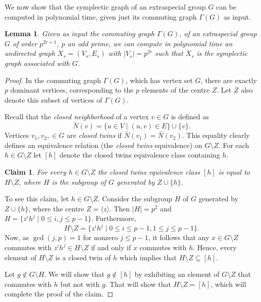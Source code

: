 \documentclass{elsarticle}
\newtheorem{lemma}[theorem]{Lemma}
\newtheorem{claim}[theorem]{Claim}
\renewcommand{\angle}[1]{\langle#1\rangle} %
\begin{document}
We now show that the symplectic graph of an extraspecial group $G$ can
be computed in polynomial time, given just its commuting graph
$\Gamma(G)$ as input.

\begin{lemma}\label{commute-to-sympl}
  Given as input the commuting graph $\Gamma(G)$, of an extraspecial
  group $G$ of order $p^{2r+1}$, $p$ an odd prime, we can compute in
  polynomial time an undirected graph $X_s=(V_s,E_s)$ with
  $|V_s|=p^{2r}$ such that $X_s$ is the symplectic graph
  associated with $G$.
\end{lemma}

\begin{proof}
  In the commuting graph $\Gamma(G)$, which has vertex set $G$, there
  are exactly $p$ dominant vertices, corresponding to the $p$ elements
  of the centre $Z$. Let $Z$ also denote this subset of vertices of
  $\Gamma(G)$.

  Recall that the \emph{closed neighborhood} of a vertex $v\in G$ is defined
  as
\[
\bar{N}(v) = \{u\in V\mid (u,v)\in E\} \cup \{v\}.
\]
Vertices $v_1,v_2,\in G$ are \emph{closed twins} if
$\bar{N}(v_1)=\bar{N}(v_2)$. This equality clearly defines an
equivalence relation (the \emph{closed twins} equivalence) on
$G\setminus Z$. For each $h\in G\setminus Z$ let $[h]$ denote the
closed twins equivalence class containing $h$.

\begin{claim}
  For every $h\in G\setminus Z$ the closed twins equivalence class
  $[h]$ is equal to $H\setminus Z$, where $H$ is the subgroup of $G$
  generated by $Z\cup \{h\}$.
\end{claim}

To see this claim, let $h\in G\setminus Z$. Consider the subgroup $H$
of $G$ generated by $Z\cup \{h\}$, where the centre
$Z=\angle{z}$. Then $|H|=p^2$ and $H=\{z^ih^j\mid 0\le i, j \le p-1\}$.
Furthermore,
\[
  H\setminus Z=\{z^ih^j\mid 0\le i\le p-1, 1\le j\le p-1\}.
\]
Now, as $\gcd(j,p)=1$ for nonzero $j\le p-1$, it follows that any
$x\in G\setminus Z$ commutes with $z^ih^j\in H\setminus Z$ if and only
if $x$ commutes with $h$. Hence, every element of $H\setminus Z$ is a
closed twin of $h$ which implies that $H\setminus Z\subseteq [h]$.

Let $g\notin G\setminus H$. We will show that $g\notin [h]$ by
exhibiting an element of $G\setminus Z$ that commutes with $h$ but not
with $g$. That will show that $H\setminus Z=[h]$, which will complete
the proof of the claim.


\end{proof}
\end{document}
